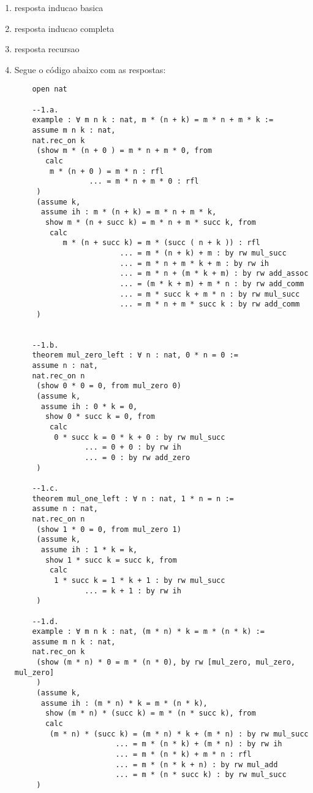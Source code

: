 \begin{enumerate}
    \item resposta inducao basica
    
    \item resposta inducao completa
    
    \item resposta recursao
    
    \item Segue o código abaixo com as respostas:
    
    \begin{lstlisting}
    open nat
    
    --1.a.
    example : ∀ m n k : nat, m * (n + k) = m * n + m * k := 
    assume m n k : nat,
    nat.rec_on k
     (show m * (n + 0 ) = m * n + m * 0, from
       calc 
        m * (n + 0 ) = m * n : rfl 
                 ... = m * n + m * 0 : rfl
     )
     (assume k,
      assume ih : m * (n + k) = m * n + m * k,
       show m * (n + succ k) = m * n + m * succ k, from
        calc
           m * (n + succ k) = m * (succ ( n + k )) : rfl
                        ... = m * (n + k) + m : by rw mul_succ 
                        ... = m * n + m * k + m : by rw ih
                        ... = m * n + (m * k + m) : by rw add_assoc
                        ... = (m * k + m) + m * n : by rw add_comm
                        ... = m * succ k + m * n : by rw mul_succ
                        ... = m * n + m * succ k : by rw add_comm
     )
    
    
    --1.b.
    theorem mul_zero_left : ∀ n : nat, 0 * n = 0 :=
    assume n : nat,
    nat.rec_on n
     (show 0 * 0 = 0, from mul_zero 0)
     (assume k,
      assume ih : 0 * k = 0,
       show 0 * succ k = 0, from
        calc
         0 * succ k = 0 * k + 0 : by rw mul_succ
                ... = 0 + 0 : by rw ih
                ... = 0 : by rw add_zero
     )
    
    --1.c.
    theorem mul_one_left : ∀ n : nat, 1 * n = n := 
    assume n : nat,
    nat.rec_on n
     (show 1 * 0 = 0, from mul_zero 1)
     (assume k,
      assume ih : 1 * k = k,
       show 1 * succ k = succ k, from
        calc
         1 * succ k = 1 * k + 1 : by rw mul_succ
                ... = k + 1 : by rw ih
     )
    
    --1.d.
    example : ∀ m n k : nat, (m * n) * k = m * (n * k) := 
    assume m n k : nat,
    nat.rec_on k
     (show (m * n) * 0 = m * (n * 0), by rw [mul_zero, mul_zero, mul_zero]
     )
     (assume k,
      assume ih : (m * n) * k = m * (n * k),
       show (m * n) * (succ k) = m * (n * succ k), from
       calc 
        (m * n) * (succ k) = (m * n) * k + (m * n) : by rw mul_succ
                       ... = m * (n * k) + (m * n) : by rw ih
                       ... = m * (n * k) + m * n : rfl
                       ... = m * (n * k + n) : by rw mul_add
                       ... = m * (n * succ k) : by rw mul_succ
     )
    

\end{lstlisting}
\end{enumerate}
